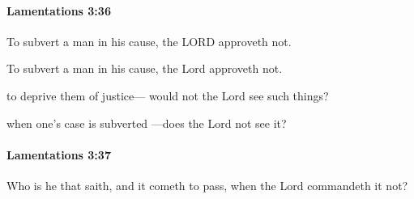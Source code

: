 		\paragraph{Lamentations 3:36} %
			\label{LAMENTATIONS-3-36}

			To subvert a man in his cause, the LORD approveth not.

			\begin{versebox}
					\item[BHS] 
					\item[LXX] 
					\item[ASV] To subvert a man in his cause, the Lord approveth not.
					\item[NIV] to deprive them of justice— would not the Lord see such things?
					\item[NRSV] when one’s case is subverted —does the Lord not see it?
			\end{versebox}

		\paragraph{Lamentations 3:37} %
			\label{LAMENTATIONS-3-37}

			Who is he that saith, and it cometh to pass, when the Lord commandeth it not?

